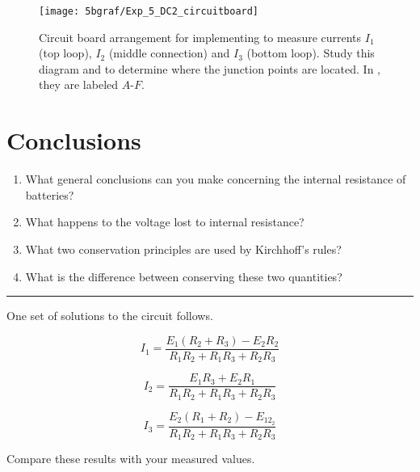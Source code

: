 \begin{figure} \centering
	\label{f:circboard}
	\centering
	\texttt{[image: 5bgraf/Exp\_5\_DC2\_circuitboard]}
	\caption{Circuit board arrangement for implementing  to measure currents $I_{1}$ (top loop), $I_{2}$ (middle connection) and $I_{3}$ (bottom loop).  Study this diagram and  to determine where the junction points are located.  In , they are labeled $A$-$F$. }
\end{figure}

\section {Conclusions}
\begin{enumerate}
	\item  What general conclusions can you make concerning the internal resistance of batteries?  
	\item What happens to the voltage lost to internal resistance?  
	\item What two conservation principles are used by Kirchhoff's rules?
	\item What is the difference between conserving these two quantities?
\end{enumerate}

\vskip5pt \hrule
\bigskip
One set of solutions to the circuit follows.

\[ I_1 = \frac{E_1(R_2 +R_3) - E_2R_2}{R_1R_2 + R_1R_3 + R_2R_3}  \]

\[ I_2 = \frac{E_1R_3 + E_2R_1}{R_1R_2 + R_1R_3 + R_2R_3}  \]

\[ I_3 = \frac{E_2(R_1 +R_2) - E_12_2}{R_1R_2 + R_1R_3 + R_2R_3}  \]

Compare these results with your measured values.

